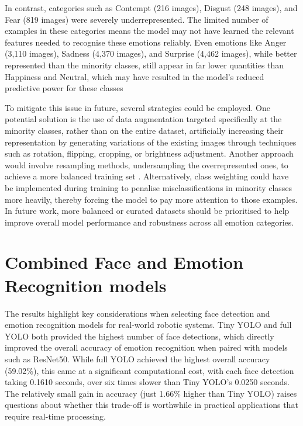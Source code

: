 In contrast, categories such as Contempt (216 images), Disgust (248 images), and Fear (819 images) were severely underrepresented. The limited number of examples in these categories means the model may not have learned the relevant features needed to recognise these emotions reliably. Even emotions like Anger (3,110 images), Sadness (4,370 images), and Surprise (4,462 images), while better represented than the minority classes, still appear in far lower quantities than Happiness and Neutral, which may have resulted in the model's reduced predictive power for these classes

To mitigate this issue in future, several strategies could be employed. One potential solution is the use of data augmentation targeted specifically at the minority classes, rather than on the entire dataset, artificially increasing their representation by generating variations of the existing images through techniques such as rotation, flipping, cropping, or brightness adjustment. Another approach would involve resampling methods, undersampling the overrepresented ones, to achieve a more balanced training set \cite{Mohammed2020-bz}. Alternatively, class weighting \cite{Johnson2019-xc} could have be implemented during training to penalise misclassifications in minority classes more heavily, thereby forcing the model to pay more attention to those examples. In future work, more balanced or curated datasets should be prioritised to help improve overall model performance and robustness across all emotion categories.

\section{Combined Face and Emotion Recognition models}

The results highlight key considerations when selecting face detection and emotion recognition models for real-world robotic systems. Tiny YOLO and full YOLO both provided the highest number of face detections, which directly improved the overall accuracy of emotion recognition when paired with models such as ResNet50. While full YOLO achieved the highest overall accuracy (59.02\%), this came at a significant computational cost, with each face detection taking 0.1610 seconds, over six times slower than Tiny YOLO's 0.0250 seconds. The relatively small gain in accuracy (just 1.66\% higher than Tiny YOLO) raises questions about whether this trade-off is worthwhile in practical applications that require real-time processing.

